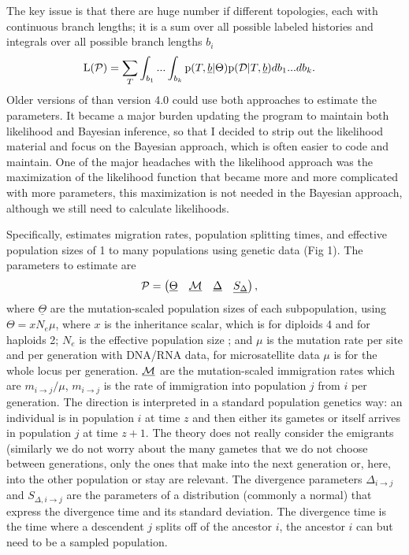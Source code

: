  The key issue is that there are huge number if different topologies, each with continuous branch lengths; it  is a sum over all possible labeled histories and integrals over all possible branch lengths $b_i$
\begin{align}
{\rm L}(\mathcal{P}) &= \sum_T \int_{b_1} ... \int_{b_k} {\rm p}(T,\underline{b} | \Theta) {\rm p}({ \mathcal D} | T,\underline{b}) db_1...db_k.
\end{align}
Older versions of \migrate than version 4.0 could use both approaches to estimate the parameters. It became a major burden updating the program to maintain both likelihood and Bayesian inference, so that I decided to strip out the likelihood material and focus on the Bayesian approach, which is often easier to code and maintain. One of the major headaches with the likelihood approach was the maximization of the likelihood function that became more and more complicated with more parameters, this maximization is not needed in the Bayesian approach, although we still need to calculate likelihoods.

Specifically, \migrate estimates migration rates, population splitting times, and effective population sizes of 1 to many populations
using genetic data (Fig 1).  The parameters to estimate are
\begin{align}
\label{PARAMETERS}
\mathcal{P} &= \left(\begin{matrix}  \underline{\Theta} & \underline{\mathcal{M}} & \underline{\Delta} & \underline{S_\Delta}\end{matrix}\right),
\end{align}
where $ \underline{\Theta}$ are the mutation-scaled population sizes of each subpopulation, using $\Theta=xN_e\mu$, where $x$ is the inheritance scalar, which is for diploids 4 and for haploids 2; $N_e$ is the effective population size ; and $\mu$ is the mutation rate per site and per generation with DNA/RNA data, for microsatellite data $\mu$ is for the whole locus per generation. $ \underline{\mathcal{M}}$ are the mutation-scaled immigration rates which are $m_{i\rightarrow j} / \mu$, $m_{i\rightarrow j}$ is the rate of immigration into population $j$ from $i$ per generation. The direction is interpreted in a standard population genetics way: an individual is in population $i$ at time $z$ and then either its gametes or itself arrives in population $j$ at time $z+1$. The theory does not really consider the emigrants (similarly we do not worry about the many gametes that we do not choose between generations, only the ones that make into the next generation or, here, into the other population or stay are relevant. The divergence parameters $\Delta_{i\rightarrow j}$ and $S_{\Delta, i\rightarrow j}$ are the parameters of a distribution (commonly a normal) that express the divergence time and its standard deviation. The divergence time is the time where a descendent $j$ splits off of the ancestor $i$, the ancestor $i$ can but need to be a sampled population.  
